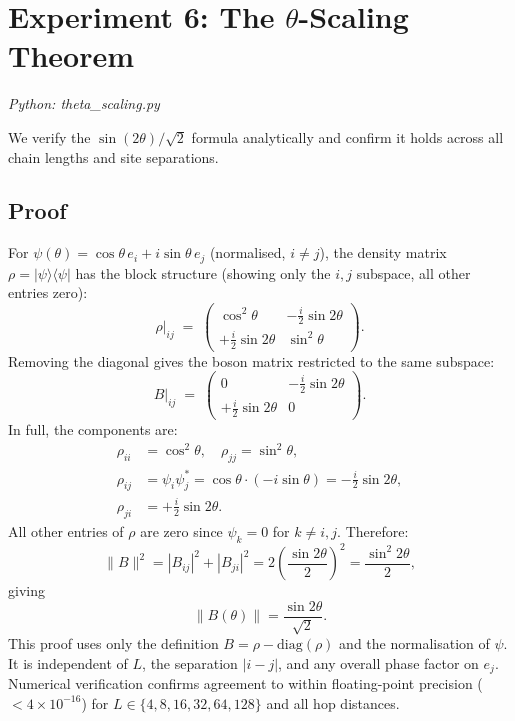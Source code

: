 \documentclass[11pt]{article}
\begin{document}
\section{Experiment 6: The $\theta$-Scaling Theorem}
\label{sec:exp6}

\textit{Python: theta\_scaling.py}

We verify the $\sin(2\theta)/\sqrt{2}$ formula analytically and confirm it
holds across all chain lengths and site separations.

\subsection*{Proof}

For $\psi(\theta) = \cos\theta\,e_i + i\sin\theta\,e_j$ (normalised, $i \neq j$),
the density matrix $\rho = |\psi\rangle\langle\psi|$ has the block structure
(showing only the $i,j$ subspace, all other entries zero):
\[
  \rho\big|_{ij} \;=\;
  \begin{pmatrix} \cos^2\theta & -\tfrac{i}{2}\sin 2\theta \\[4pt]
                  +\tfrac{i}{2}\sin 2\theta & \sin^2\theta \end{pmatrix}.
\]
Removing the diagonal gives the boson matrix restricted to the same subspace:
\[
  B\big|_{ij} \;=\;
  \begin{pmatrix} 0 & -\tfrac{i}{2}\sin 2\theta \\[4pt]
                  +\tfrac{i}{2}\sin 2\theta & 0 \end{pmatrix}.
\]
In full, the components are:
\begin{align*}
  \rho_{ii} &= \cos^2\theta, \quad
  \rho_{jj} = \sin^2\theta, \\
  \rho_{ij} &= \psi_i\psi_j^* = \cos\theta\cdot(-i\sin\theta) = -\tfrac{i}{2}\sin 2\theta, \\
  \rho_{ji} &= +\tfrac{i}{2}\sin 2\theta.
\end{align*}
All other entries of $\rho$ are zero since $\psi_k = 0$ for $k \neq i, j$.
Therefore:
\[
  \|B\|^2 = |B_{ij}|^2 + |B_{ji}|^2
  = 2\left(\frac{\sin 2\theta}{2}\right)^2
  = \frac{\sin^2 2\theta}{2},
\]
giving
\[
  \boxed{\|B(\theta)\| = \frac{\sin 2\theta}{\sqrt{2}}.}
\]
This proof uses only the definition $B = \rho - \mathrm{diag}(\rho)$ and the
normalisation of $\psi$.
It is independent of $L$, the separation $|i - j|$, and any overall phase
factor on $e_j$.
Numerical verification confirms agreement to within floating-point precision
($< 4 \times 10^{-16}$) for $L \in \{4, 8, 16, 32, 64, 128\}$ and all hop
distances.
\end{document}
